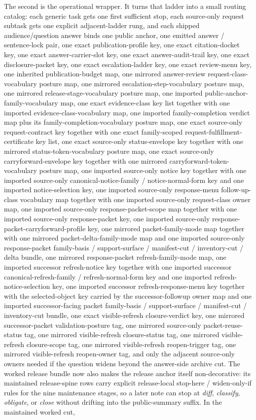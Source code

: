 \documentclass[11pt]{article}
\begin{document}
The second is the operational wrapper. It turns that ladder into a small routing catalog: each generic task gets one first sufficient stop, each source-only request subtask gets one explicit adjacent-ladder rung, and each shipped audience/question answer binds one public anchor, one emitted answer / sentence-lock pair, one exact publication-profile key, one exact citation-docket key, one exact answer-carrier-slot key, one exact answer-audit-trail key, one exact disclosure-packet key, one exact escalation-ladder key, one exact review-menu key, one inherited publication-budget map, one mirrored answer-review request-class-vocabulary posture map, one mirrored escalation-step-vocabulary posture map, one mirrored release-stage-vocabulary posture map, one imported public-anchor-family-vocabulary map, one exact evidence-class key list together with one imported evidence-class-vocabulary map, one imported family-completion verdict map plus its family-completion-vocabulary posture map, one exact source-only request-contract key together with one exact family-scoped request-fulfillment-certificate key list, one exact source-only status-envelope key together with one mirrored status-token-vocabulary posture map, one exact source-only carryforward-envelope key together with one mirrored carryforward-token-vocabulary posture map, one imported source-only notice key together with one imported source-only canonical-notice-family / notice-normal-form key and one imported notice-selection key, one imported source-only response-menu follow-up-class vocabulary map together with one imported source-only request-class owner map, one imported source-only response-packet-scope map together with one imported source-only response-packet key, one imported source-only response-packet-carryforward-profile key, one mirrored packet-family-mode map together with one mirrored packet-delta-family-mode map and one imported source-only response-packet family-basis / support-surface / manifest-cut / inventory-cut / delta bundle, one mirrored response-packet refresh-family-mode map, one imported successor refresh-notice key together with one imported successor canonical-refresh-family / refresh-normal-form key and one imported refresh-notice-selection key, one imported successor refresh-response-menu key together with the selected-object key carried by the successor-followup owner map and one imported successor-facing packet family-basis / support-surface / manifest-cut / inventory-cut bundle, one exact visible-refresh closure-verdict key, one mirrored successor-packet validation-posture tag, one mirrored source-only packet-reuse-status tag, one mirrored visible-refresh closure-status tag, one mirrored visible-refresh closure-scope tag, one mirrored visible-refresh reopen-trigger tag, one mirrored visible-refresh reopen-owner tag, and only the adjacent source-only owners needed if the question widens beyond the answer-side archive cut. The worked release bundle now also makes the release anchor itself non-decorative: its maintained release-spine rows carry explicit release-local stop-here / widen-only-if rules for the nine maintenance stages, so a later note can stop at \emph{diff}, \emph{classify}, \emph{obligate}, or \emph{close} without drifting into the public-summary suffix. In the maintained worked cut, 
\end{document}
